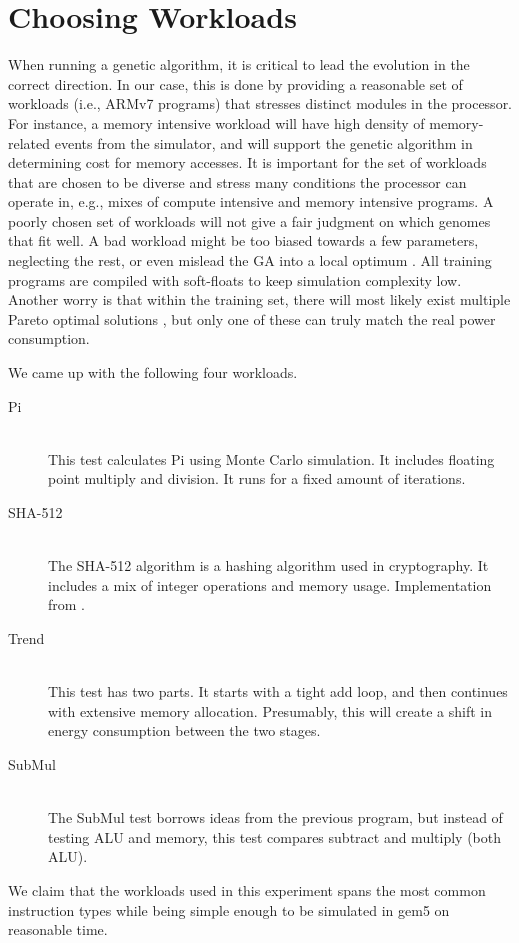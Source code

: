 \section{Choosing Workloads}
\label{sec:workloads}

When running a genetic algorithm, it is critical to lead the evolution in the
correct direction. In our case, this is done by providing a reasonable set of
workloads (i.e., ARMv7 programs) that stresses distinct modules in the processor.
For instance, a memory intensive workload will have high density of
memory-related events from the simulator, and will support the genetic algorithm
in determining cost for memory accesses. It is important for the set of
workloads that are chosen to be diverse and stress many conditions the processor
can operate in, e.g., mixes of compute intensive and memory intensive programs. A
poorly chosen set of workloads will not give a fair judgment on which genomes
that fit well. A bad workload might be too biased towards a few parameters,
neglecting the rest, or even mislead the GA into a local optimum
\cite{introtoga}. All training programs are compiled with soft-floats to keep
simulation complexity low. Another worry is that within the training set, there
will most likely exist multiple Pareto optimal solutions \cite{deb2014multi},
but only one of these can truly match the real power consumption.

We came up with the following four workloads.

\newpage

\begin{description}
    \item[Pi] \hfill \\
        This test calculates Pi using Monte Carlo simulation. It includes
        floating point multiply and division. It runs for a fixed amount of
        iterations.
    \item[SHA-512] \hfill \\
        The SHA-512 algorithm is a hashing algorithm used in cryptography. It
        includes a mix of integer operations and memory usage. Implementation
        from \cite{sha2}.
    \item[Trend] \hfill \\
        This test has two parts. It starts with a tight add loop, and then
        continues with extensive memory allocation. Presumably, this will create
        a shift in energy consumption between the two stages.
    \item[SubMul] \hfill \\
        The SubMul test borrows ideas from the previous program, but instead of
        testing ALU and memory, this test compares subtract and multiply (both
        ALU).
\end{description}

We claim that the workloads used in this experiment spans the most common
instruction types while being simple enough to be simulated in gem5 on
reasonable time.

